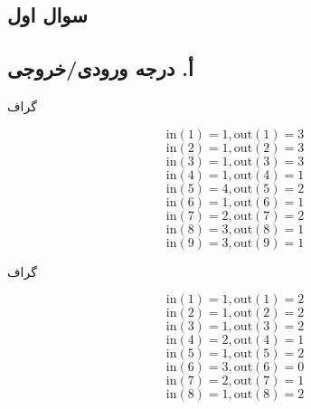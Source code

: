 \documentclass{article}
\begin{document}
\begin{multicols}{2}


\section*{سوال اول}

\subsection*{أ. درجه ورودی/خروجی}
گراف 
\begin{LTR}
$$\text{in} \left( 1 \right) = 1, \text{out} \left( 1 \right) = 3$$
$$\text{in} \left( 2 \right) = 1, \text{out} \left( 2 \right) = 3$$
$$\text{in} \left( 3 \right) = 1, \text{out} \left( 3 \right) = 3$$
$$\text{in} \left( 4 \right) = 1, \text{out} \left( 4 \right) = 1$$
$$\text{in} \left( 5 \right) = 4, \text{out} \left( 5 \right) = 2$$
$$\text{in} \left( 6 \right) = 1, \text{out} \left( 6 \right) = 1$$
$$\text{in} \left( 7 \right) = 2, \text{out} \left( 7 \right) = 2$$
$$\text{in} \left( 8 \right) = 3, \text{out} \left( 8 \right) = 1$$
$$\text{in} \left( 9 \right) = 3, \text{out} \left( 9 \right) = 1$$
\end{LTR}

گراف 
\begin{LTR}
$$\text{in} \left( 1 \right) = 1, \text{out} \left( 1 \right) = 2$$
$$\text{in} \left( 2 \right) = 1, \text{out} \left( 2 \right) = 2$$
$$\text{in} \left( 3 \right) = 1, \text{out} \left( 3 \right) = 2$$
$$\text{in} \left( 4 \right) = 2, \text{out} \left( 4 \right) = 1$$
$$\text{in} \left( 5 \right) = 1, \text{out} \left( 5 \right) = 2$$
$$\text{in} \left( 6 \right) = 3, \text{out} \left( 6 \right) = 0$$
$$\text{in} \left( 7 \right) = 2, \text{out} \left( 7 \right) = 1$$
$$\text{in} \left( 8 \right) = 1, \text{out} \left( 8 \right) = 2$$
\end{LTR}


\end{multicols}
\end{document}

